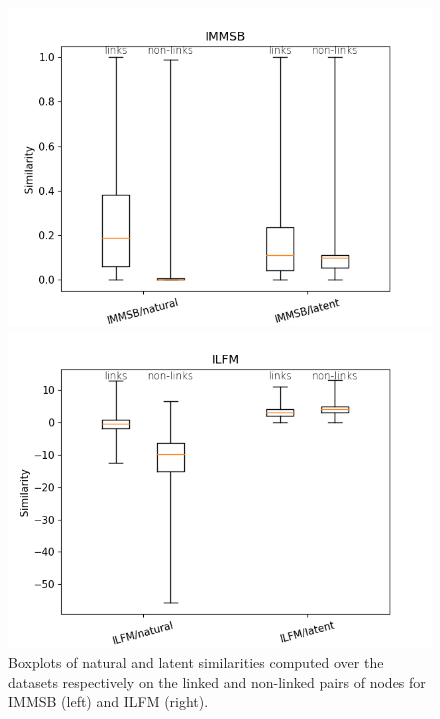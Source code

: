 \begin{figure}[h]
\centering
    \begin{minipage}{0.24\textwidth}
        \includegraphics[width=\textwidth]{img/corpus/homo_mustach_immsb}
    \end{minipage}
    \begin{minipage}{0.24\textwidth}
        \includegraphics[width=\textwidth]{img/corpus/homo_mustach_ilfm}
    \end{minipage}
    \caption{Boxplots of natural and latent similarities computed over the datasets respectively on the linked and non-linked pairs of nodes for IMMSB (left) and ILFM (right). }
    \label{fig:homo_mustach}
\end{figure}


